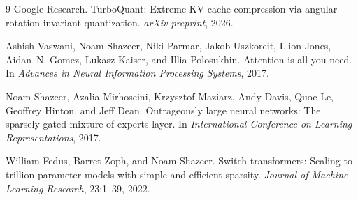 \documentclass[10pt,conference]{IEEEtran}
\begin{document}
\begin{thebibliography}{9}
Google Research.
\newblock TurboQuant: Extreme KV-cache compression via angular rotation-invariant quantization.
\newblock \emph{arXiv preprint}, 2026.

Ashish Vaswani, Noam Shazeer, Niki Parmar, Jakob Uszkoreit, Llion Jones, Aidan~N. Gomez, Lukasz Kaiser, and Illia Polosukhin.
\newblock Attention is all you need.
\newblock In \emph{Advances in Neural Information Processing Systems}, 2017.

Noam Shazeer, Azalia Mirhoseini, Krzysztof Maziarz, Andy Davis, Quoc Le, Geoffrey Hinton, and Jeff Dean.
\newblock Outrageously large neural networks: The sparsely-gated mixture-of-experts layer.
\newblock In \emph{International Conference on Learning Representations}, 2017.

William Fedus, Barret Zoph, and Noam Shazeer.
\newblock Switch transformers: Scaling to trillion parameter models with simple and efficient sparsity.
\newblock \emph{Journal of Machine Learning Research}, 23:1--39, 2022.
\end{thebibliography}

\balance
\end{document}
